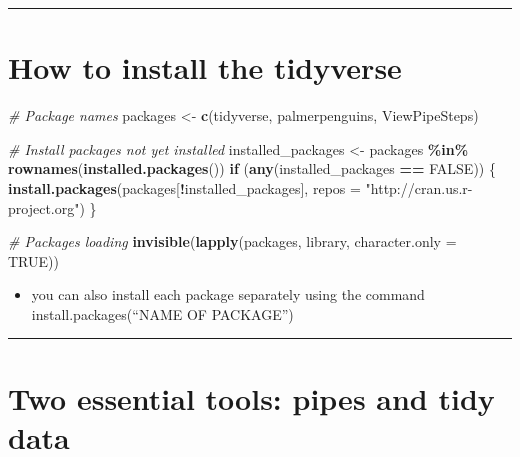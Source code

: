 \documentclass[
]{article}
\newenvironment{Shaded}{\begin{snugshade}}{\end{snugshade}}
\newcommand{\AttributeTok}[1]{\textcolor[rgb]{0.13,0.29,0.53}{#1}}
\newcommand{\CommentTok}[1]{\textcolor[rgb]{0.56,0.35,0.01}{\textit{#1}}}
\newcommand{\ConstantTok}[1]{\textcolor[rgb]{0.56,0.35,0.01}{#1}}
\newcommand{\ControlFlowTok}[1]{\textcolor[rgb]{0.13,0.29,0.53}{\textbf{#1}}}
\newcommand{\FunctionTok}[1]{\textcolor[rgb]{0.13,0.29,0.53}{\textbf{#1}}}
\newcommand{\NormalTok}[1]{#1}
\newcommand{\OtherTok}[1]{\textcolor[rgb]{0.56,0.35,0.01}{#1}}
\newcommand{\SpecialCharTok}[1]{\textcolor[rgb]{0.81,0.36,0.00}{\textbf{#1}}}
\newcommand{\StringTok}[1]{\textcolor[rgb]{0.31,0.60,0.02}{#1}}
\providecommand{\tightlist}{%
  \setlength{\itemsep}{0pt}\setlength{\parskip}{0pt}}
\begin{document}


\begin{center}\rule{0.5\linewidth}{0.5pt}\end{center}

\hypertarget{how-to-install-the-tidyverse}{%
\section{How to install the
tidyverse}\label{how-to-install-the-tidyverse}}

\begin{Shaded}
\begin{Highlighting}[]
\CommentTok{\# Package names}
\NormalTok{packages }\OtherTok{\textless{}{-}} \FunctionTok{c}\NormalTok{(}\StringTok{\textquotesingle{}tidyverse\textquotesingle{}}\NormalTok{, }\StringTok{\textquotesingle{}palmerpenguins\textquotesingle{}}\NormalTok{, }\StringTok{\textquotesingle{}ViewPipeSteps\textquotesingle{}}\NormalTok{)}
              
\CommentTok{\# Install packages not yet installed}
\NormalTok{installed\_packages }\OtherTok{\textless{}{-}}\NormalTok{ packages }\SpecialCharTok{\%in\%} \FunctionTok{rownames}\NormalTok{(}\FunctionTok{installed.packages}\NormalTok{())}
\ControlFlowTok{if}\NormalTok{ (}\FunctionTok{any}\NormalTok{(installed\_packages }\SpecialCharTok{==} \ConstantTok{FALSE}\NormalTok{)) \{}
  \FunctionTok{install.packages}\NormalTok{(packages[}\SpecialCharTok{!}\NormalTok{installed\_packages], }\AttributeTok{repos =} \StringTok{"http://cran.us.r{-}project.org"}\NormalTok{)}
\NormalTok{\}}

\CommentTok{\# Packages loading}
\FunctionTok{invisible}\NormalTok{(}\FunctionTok{lapply}\NormalTok{(packages, library, }\AttributeTok{character.only =} \ConstantTok{TRUE}\NormalTok{))}
\end{Highlighting}
\end{Shaded}

\begin{itemize}
\tightlist
\item
  you can also install each package separately using the command
  install.packages(``NAME OF PACKAGE'')
\end{itemize}

\begin{center}\rule{0.5\linewidth}{0.5pt}\end{center}

\hypertarget{two-essential-tools-pipes-and-tidy-data}{%
\section{Two essential tools: pipes and tidy
data}\label{two-essential-tools-pipes-and-tidy-data}}
\end{document}
